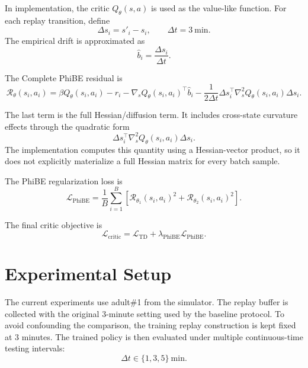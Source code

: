 \documentclass[11pt]{article}
\begin{document}
In implementation, the critic \(Q_\theta(s,a)\) is used as the value-like function.
For each replay transition, define
\begin{equation}
\Delta s_i = s'_i - s_i,
\qquad
\Delta t = 3 \ \mathrm{min}.
\end{equation}
The empirical drift is approximated as
\begin{equation}
\hat{b}_i = \frac{\Delta s_i}{\Delta t}.
\end{equation}

The Complete PhiBE residual is
\begin{equation}
\mathcal{R}_{\theta}(s_i,a_i)
=
\beta Q_{\theta}(s_i,a_i)
- r_i
- \nabla_s Q_{\theta}(s_i,a_i)^\top \hat{b}_i
- \frac{1}{2\Delta t}
\Delta s_i^\top
\nabla_s^2 Q_{\theta}(s_i,a_i)
\Delta s_i .
\end{equation}

The last term is the full Hessian/diffusion term. It includes cross-state curvature
effects through the quadratic form
\begin{equation}
\Delta s_i^\top
\nabla_s^2 Q_{\theta}(s_i,a_i)
\Delta s_i.
\end{equation}
The implementation computes this quantity using a Hessian-vector product, so it does not
explicitly materialize a full Hessian matrix for every batch sample.

The PhiBE regularization loss is
\begin{equation}
\mathcal{L}_{\mathrm{PhiBE}}
=
\frac{1}{B}
\sum_{i=1}^{B}
\left[
\mathcal{R}_{\theta_1}(s_i,a_i)^2
+
\mathcal{R}_{\theta_2}(s_i,a_i)^2
\right].
\end{equation}

The final critic objective is
\begin{equation}
\mathcal{L}_{\mathrm{critic}}
=
\mathcal{L}_{\mathrm{TD}}
+
\lambda_{\mathrm{PhiBE}}
\mathcal{L}_{\mathrm{PhiBE}}.
\end{equation}

\section{Experimental Setup}

The current experiments use adult\#1 from the simulator. The replay buffer is collected
with the original 3-minute setting used by the baseline protocol. To avoid confounding the
comparison, the training replay construction is kept fixed at 3 minutes. The trained policy
is then evaluated under multiple continuous-time testing intervals:
\[
\Delta t \in \{1,3,5\} \ \mathrm{min}.
\]
\end{document}
